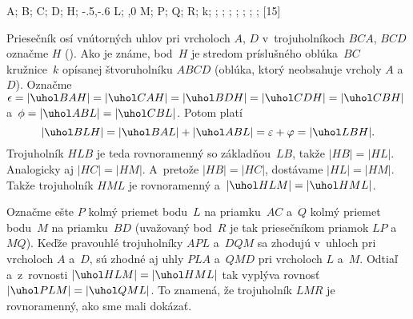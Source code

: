 {%
\fontplace
\rBpoint A; \rtpoint B; \ltpoint C; \lBpoint D;
\tpoint H; \tpoint\xy-.5,-.6 L; \ltpoint{},0 M;
\lBpoint P; \rBpoint Q; \bpoint R;
\lBpoint k;
\cpoint\epsilon; \cpoint\epsilon; \cpoint\epsilon;
\cpoint\epsilon; \cpoint\epsilon;
\cpoint\phi; \cpoint\phi;
[15] \hfil\Obr

 Priesečník osí vnútorných uhlov pri vrcholoch $A$, $D$ 
v~trojuholníkoch $BCA$, $BCD$ označme $H$ (\obr). Ako je známe,
\inspicture{}
bod~$H$ je stredom príslušného oblúka~$BC$ kružnice~$k$ opísanej
štvoruholníku $ABCD$ (oblúka, ktorý neobsahuje vrcholy $A$ a~$D$).
Označme $\epsilon= |\uhol BAH|= |\uhol CAH|= |\uhol BDH| = |\uhol CDH|= |\uhol CBH|$ a~$\phi=|\uhol ABL|=|\uhol CBL|$.
Potom platí
$$
|\uhol BLH|=|\uhol BAL|+|\uhol ABL|%
            =\varepsilon+\varphi=|\uhol LBH|.
$$
Trojuholník $HLB$ je teda rovnoramenný so základňou~$LB$, takže
$|HB|=|HL|$. Analogicky aj $|HC|=|HM|$. A~pretože $|HB|=|HC|$,
dostávame $|HL|=|HM|$. Takže trojuholník $HML$ je rovnoramenný
a~$|\uhol HLM|=|\uhol HML|$.

Označme ešte $P$ kolmý priemet bodu~$L$ na priamku~$AC$ a~$Q$
kolmý priemet bodu~$M$ na priamku~$BD$ (uvažovaný bod~$R$ je tak
priesečníkom priamok $LP$ a~$MQ$). Keďže pravouhlé
trojuholníky $APL$ a~$DQM$ sa zhodujú v~uhloch pri vrcholoch $A$
a~$D$, sú zhodné aj uhly $PLA$ a~$QMD$ pri vrcholoch $L$ a~$M$.
Odtiaľ a~z~rovnosti $|\uhol HLM|=|\uhol HML|$ tak vyplýva
rovnosť $|\uhol PLM|=|\uhol QML|$. To znamená,
že trojuholník $LMR$ je rovnoramenný, ako sme mali dokázať.
}

